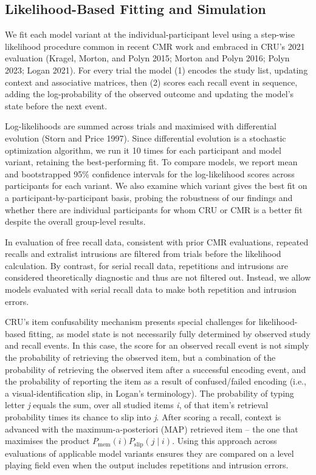 \documentclass[
  letterpaper,
  DIV=11,
  numbers=noendperiod]{scrartcl}
\begin{document}
\subsection{Likelihood-Based Fitting and
Simulation}\label{likelihood-based-fitting-and-simulation}

We fit each model variant at the individual-participant level using a
step-wise likelihood procedure common in recent CMR work and embraced in
CRU's 2021 evaluation (Kragel, Morton, and Polyn 2015; Morton and Polyn
2016; Polyn 2023; Logan 2021). For every trial the model (1) encodes the
study list, updating context and associative matrices, then (2) scores
each recall event in sequence, adding the log-probability of the
observed outcome and updating the model's state before the next event.

Log-likelihoods are summed across trials and maximised with differential
evolution (Storn and Price 1997). Since differential evolution is a
stochastic optimization algorithm, we run it 10 times for each
participant and model variant, retaining the best-performing fit. To
compare models, we report mean and bootstrapped 95\% confidence
intervals for the log-likelihood scores across participants for each
variant. We also examine which variant gives the best fit on a
participant-by-participant basis, probing the robustness of our findings
and whether there are individual participants for whom CRU or CMR is a
better fit despite the overall group-level results.

In evaluation of free recall data, consistent with prior CMR
evaluations, repeated recalls and extralist intrusions are filtered from
trials before the likelihood calculation. By contrast, for serial recall
data, repetitions and intrusions are considered theoretically diagnostic
and thus are not filtered out. Instead, we allow models evaluated with
serial recall data to make both repetition and intrusion errors.

CRU's item confusability mechanism presents special challenges for
likelihood-based fitting, as model state is not necessarily fully
determined by observed study and recall events. In this case, the score
for an observed recall event is not simply the probability of retrieving
the observed item, but a combination of the probability of retrieving
the observed item after a successful encoding event, and the probability
of reporting the item as a result of confused/failed encoding (i.e., a
visual-identification slip, in Logan's terminology). The probability of
typing letter \emph{j} equals the sum, over all studied items \emph{i},
of that item's retrieval probability times its chance to slip into
\emph{j}. After scoring a recall, context is advanced with the
maximum-a-posteriori (MAP) retrieved item -- the one that maximises the
product \(P_{\text{mem}}(i)P_{\text{slip}}(j\mid i)\). Using this
approach across evaluations of applicable model variants ensures they
are compared on a level playing field even when the output includes
repetitions and intrusion errors.
\end{document}
